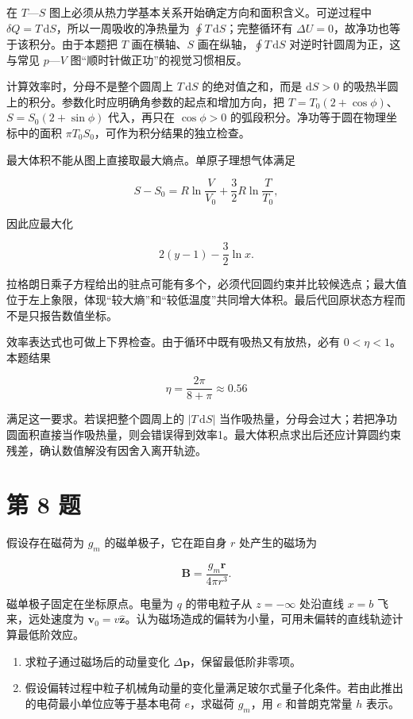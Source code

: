 \documentclass[12pt,a4paper,UTF8]{ctexart}
\newcommand{\tightlist}{\setlength{\itemsep}{0pt}\setlength{\parskip}{0pt}}
\begin{document}
在 \(T\)---\(S\)
图上必须从热力学基本关系开始确定方向和面积含义。可逆过程中
\(\delta Q=T\,\mathrm dS\)，所以一周吸收的净热量为
\(\oint T\,\mathrm dS\)；完整循环有
\(\Delta U=0\)，故净功也等于该积分。由于本题把 \(T\) 画在横轴、\(S\)
画在纵轴，\(\oint T\,\mathrm dS\) 对逆时针圆周为正，这与常见
\(p\)---\(V\) 图``顺时针做正功''的视觉习惯相反。

计算效率时，分母不是整个圆周上 \(T\,\mathrm dS\) 的绝对值之和，而是
\(\mathrm dS>0\)
的吸热半圆上的积分。参数化时应明确角参数的起点和增加方向，把
\(T=T_0(2+\cos\phi)\)、\(S=S_0(2+\sin\phi)\) 代入，再只在 \(\cos\phi>0\)
的弧段积分。净功等于圆在物理坐标中的面积
\(\pi T_0S_0\)，可作为积分结果的独立检查。

最大体积不能从图上直接取最大熵点。单原子理想气体满足

\[S-S_0=R\ln\frac{V}{V_0}+\frac32R\ln\frac{T}{T_0},\]

因此应最大化

\[2(y-1)-\frac32\ln x.\]

拉格朗日乘子方程给出的驻点可能有多个，必须代回圆约束并比较候选点；最大值位于左上象限，体现``较大熵''和``较低温度''共同增大体积。最后代回原状态方程而不是只报告数值坐标。

效率表达式也可做上下界检查。由于循环中既有吸热又有放热，必有
\(0<\eta<1\)。本题结果

\[\eta=\frac{2\pi}{8+\pi}\approx0.56\]

满足这一要求。若误把整个圆周上的 \(|T\,\mathrm dS|\)
当作吸热量，分母会过大；若把净功圆面积直接当作吸热量，则会错误得到效率1。最大体积点求出后还应计算圆约束残差，确认数值解没有因舍入离开轨迹。

\newpage

\section{第 8 题}\label{ux7b2c-8-ux9898}

假设存在磁荷为 \(g_m\) 的磁单极子，它在距自身 \(r\) 处产生的磁场为

\[\boldsymbol B=\frac{g_m\boldsymbol r}{4\pi r^3}.\]

磁单极子固定在坐标原点。电量为 \(q\) 的带电粒子从 \(z=-\infty\) 处沿直线
\(x=b\) 飞来，远处速度为
\(\boldsymbol v_0=v\hat{\boldsymbol z}\)。认为磁场造成的偏转为小量，可用未偏转的直线轨迹计算最低阶效应。

\begin{enumerate}
\def\labelenumi{\arabic{enumi}.}
\tightlist
\item
  求粒子通过磁场后的动量变化 \(\Delta\boldsymbol p\)，保留最低阶非零项。
\item
  假设偏转过程中粒子机械角动量的变化量满足玻尔式量子化条件。若由此推出的电荷最小单位应等于基本电荷
  \(e\)，求磁荷 \(g_m\)，用 \(e\) 和普朗克常量 \(h\) 表示。
\end{enumerate}
\end{document}
